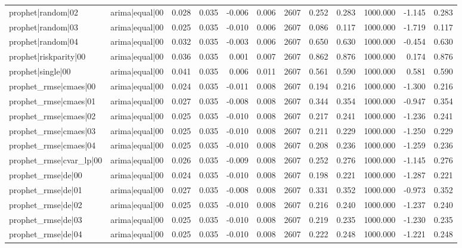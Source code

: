 \begin{table}
\begin{tabular}{llrrrrrrrrrr}
prophet|random|02 & arima|equal|00 & 0.028 & 0.035 & -0.006 & 0.006 & 2607 & 0.252 & 0.283 & 1000.000 & -1.145 & 0.283 \\
prophet|random|03 & arima|equal|00 & 0.025 & 0.035 & -0.010 & 0.006 & 2607 & 0.086 & 0.117 & 1000.000 & -1.719 & 0.117 \\
prophet|random|04 & arima|equal|00 & 0.032 & 0.035 & -0.003 & 0.006 & 2607 & 0.650 & 0.630 & 1000.000 & -0.454 & 0.630 \\
prophet|riskparity|00 & arima|equal|00 & 0.036 & 0.035 & 0.001 & 0.007 & 2607 & 0.862 & 0.876 & 1000.000 & 0.174 & 0.876 \\
prophet|single|00 & arima|equal|00 & 0.041 & 0.035 & 0.006 & 0.011 & 2607 & 0.561 & 0.590 & 1000.000 & 0.581 & 0.590 \\
prophet\_rmse|cmaes|00 & arima|equal|00 & 0.024 & 0.035 & -0.011 & 0.008 & 2607 & 0.194 & 0.216 & 1000.000 & -1.300 & 0.216 \\
prophet\_rmse|cmaes|01 & arima|equal|00 & 0.027 & 0.035 & -0.008 & 0.008 & 2607 & 0.344 & 0.354 & 1000.000 & -0.947 & 0.354 \\
prophet\_rmse|cmaes|02 & arima|equal|00 & 0.025 & 0.035 & -0.010 & 0.008 & 2607 & 0.217 & 0.241 & 1000.000 & -1.236 & 0.241 \\
prophet\_rmse|cmaes|03 & arima|equal|00 & 0.025 & 0.035 & -0.010 & 0.008 & 2607 & 0.211 & 0.229 & 1000.000 & -1.250 & 0.229 \\
prophet\_rmse|cmaes|04 & arima|equal|00 & 0.025 & 0.035 & -0.010 & 0.008 & 2607 & 0.208 & 0.236 & 1000.000 & -1.259 & 0.236 \\
prophet\_rmse|cvar\_lp|00 & arima|equal|00 & 0.026 & 0.035 & -0.009 & 0.008 & 2607 & 0.252 & 0.276 & 1000.000 & -1.145 & 0.276 \\
prophet\_rmse|de|00 & arima|equal|00 & 0.024 & 0.035 & -0.010 & 0.008 & 2607 & 0.198 & 0.221 & 1000.000 & -1.287 & 0.221 \\
prophet\_rmse|de|01 & arima|equal|00 & 0.027 & 0.035 & -0.008 & 0.008 & 2607 & 0.331 & 0.352 & 1000.000 & -0.973 & 0.352 \\
prophet\_rmse|de|02 & arima|equal|00 & 0.025 & 0.035 & -0.010 & 0.008 & 2607 & 0.216 & 0.240 & 1000.000 & -1.237 & 0.240 \\
prophet\_rmse|de|03 & arima|equal|00 & 0.025 & 0.035 & -0.010 & 0.008 & 2607 & 0.219 & 0.235 & 1000.000 & -1.230 & 0.235 \\
prophet\_rmse|de|04 & arima|equal|00 & 0.025 & 0.035 & -0.010 & 0.008 & 2607 & 0.222 & 0.248 & 1000.000 & -1.221 & 0.248 \\

\end{tabular}
\end{table}
